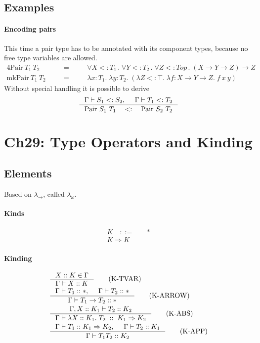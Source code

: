 \documentclass{article}
\newcommand{\lam}[2]{\lambda #1 .\;#2}
\newcommand{\lamt}[3]{\lambda #1: #2 .\;#3}
\newcommand{\lamk}[3]{\lambda #1 :: #2 .\;#3}
\newcommand{\uquant}[2]{\forall #1 \, .\; #2}
\begin{document}
\subsection{Examples}
\paragraph{Encoding pairs}
  This time a pair type has to be annotated with its component types, because no free type variables are allowed.
\begin{alignat*}{4}
  \mathrm{Pair}~T_1~T_2 &\quad&=&\quad&
    \uquant{X<:T_1}{\uquant{Y<:T_2}{\uquant{Z<:Top}{(X\to Y\to Z) \to Z}}}
  \\
  \mathrm{mkPair}~T_1~T_2 &&=&&
    \lamt{x}{T_1}{\lamt{y}{T_2}{
      (\lam{Z<:\top}{\lamt{f}{X\to Y\to Z}{f~x~y}})
    }}
\end{alignat*}
  Without special handling it is possible to derive
\[
  \inference
    {\Gamma\vdash S_1<:S_2,& \Gamma\vdash T_1<:T_2}
    {\mathrm{Pair}~S_1~T_1 \quad<:\quad \mathrm{Pair}~S_2~T_2}
\]



\section{Ch29: Type Operators and Kinding}
\subsection{Elements}
  Based on $\lambda_{\to}$, called $\lambda_{\omega}$.

\paragraph{Kinds}
  \begin{align*}
    K \quad::=\quad & * \tag{proper type}\\
      K\Rightarrow K \tag{type operator}
  \end{align*}

\paragraph{Kinding}
  \begin{align*}
    & \inference
      {X :: K \in \Gamma}
      {\Gamma\vdash X :: K}
      \tag{K-TVAR}
    \\
    & \inference
      {\Gamma\vdash T_1 :: *,
      & \Gamma\vdash T_2 :: *}
      {\Gamma\vdash T_1 \to T_2 :: *}
      \tag{K-ARROW}
    \\
    & \inference
      {\Gamma, X :: K_1 \vdash T_2 :: K_2}
      {\Gamma\vdash \lamk{X}{K_1}{T_2}\;::\;K_1 \Rightarrow K_2}
      \tag{K-ABS}
    \\
    & \inference
      {\Gamma\vdash T_1 :: K_1 \Rightarrow K_2,
      & \Gamma\vdash T_2 :: K_1}
      {\Gamma\vdash T_1 T_2 :: K_2}
      \tag{K-APP}
  \end{align*}
\end{document}
